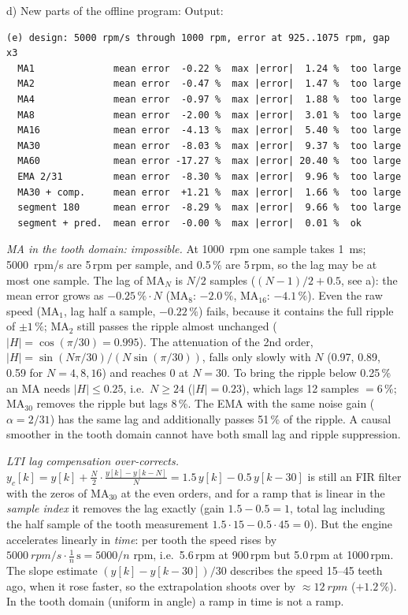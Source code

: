 \begin{solution}
d) New parts of the offline program:
Output:
\begin{lstlisting}[style=shell,numbers=none]
(e) design: 5000 rpm/s through 1000 rpm, error at 925..1075 rpm, gap x3
  MA1              mean error  -0.22 %  max |error|  1.24 %  too large
  MA2              mean error  -0.47 %  max |error|  1.47 %  too large
  MA4              mean error  -0.97 %  max |error|  1.88 %  too large
  MA8              mean error  -2.00 %  max |error|  3.01 %  too large
  MA16             mean error  -4.13 %  max |error|  5.40 %  too large
  MA30             mean error  -8.03 %  max |error|  9.37 %  too large
  MA60             mean error -17.27 %  max |error| 20.40 %  too large
  EMA 2/31         mean error  -8.30 %  max |error|  9.96 %  too large
  MA30 + comp.     mean error  +1.21 %  max |error|  1.66 %  too large
  segment 180      mean error  -8.29 %  max |error|  9.66 %  too large
  segment + pred.  mean error  -0.00 %  max |error|  0.01 %  ok
\end{lstlisting}
\emph{MA in the tooth domain: impossible.} At \SI{1000}{rpm} one sample takes
\SI{1}{ms}; \SI{5000}{rpm/s} are 5\,rpm per sample, and 0.5\,\% are 5\,rpm, so
the lag may be at most one sample. The lag of MA$_N$ is $N/2$ samples
($(N-1)/2+0.5$, see a): the mean error grows as $-0.25\,\%\cdot N$ (MA$_8$:
$-2.0\,\%$, MA$_{16}$: $-4.1\,\%$). Even the raw speed (MA$_1$, lag half a sample,
$-0.22\,\%$) fails, because it contains the full ripple of $\pm1\,\%$; MA$_2$
still passes the ripple almost unchanged ($|H|=\cos(\pi/30)=0.995$). The
attenuation of the 2nd order, $|H|=\sin(N\pi/30)/(N\sin(\pi/30))$, falls only
slowly with $N$ (0.97, 0.89, 0.59 for $N=4,8,16$) and reaches 0 at $N=30$. To
bring the ripple below 0.25\,\% an MA needs $|H|\le0.25$, i.e.\ $N\ge24$
($|H|=0.23$), which lags 12 samples $=6\,\%$; MA$_{30}$ removes the ripple but
lags 8\,\%. The EMA with the same noise gain ($\alpha=2/31$) has
the same lag and additionally passes 51\,\% of the ripple. A causal smoother
in the tooth domain cannot have both small lag and ripple suppression.

\emph{LTI lag compensation over-corrects.} $y_c[k]=y[k]+\frac N2\cdot
\frac{y[k]-y[k-N]}{N}=1.5\,y[k]-0.5\,y[k-30]$ is still an FIR filter with the
zeros of MA$_{30}$ at the even orders, and for a ramp that is linear in the
\emph{sample index} it removes the lag exactly (gain $1.5-0.5=1$, total lag including the half sample of the tooth
measurement $1.5\cdot15-0.5\cdot45=0$). But the engine accelerates linearly in \emph{time}:
per tooth the speed rises by $\SI{5000}{rpm/s}\cdot\frac{1}{n}\,\mathrm{s}
=5000/n$ rpm, i.e.\ 5.6\,rpm at 900\,rpm but 5.0\,rpm at 1000\,rpm. The slope
estimate $(y[k]-y[k-30])/30$ describes the speed 15--45 teeth ago, when it rose
faster, so the extrapolation shoots over by $\approx\SI{12}{rpm}$ ($+1.2\,\%$).
In the tooth domain (uniform in angle) a ramp in time is not a ramp.


\end{solution}
